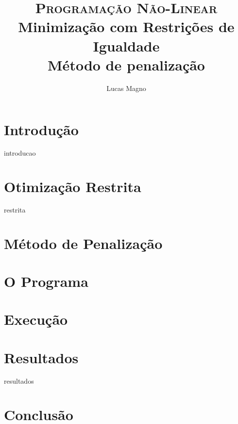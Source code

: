 \documentclass[paper=a4, fontsize=11pt]{scrartcl}	%
\title{
		\usefont{OT1}{bch}{b}{n}
		\normalfont \normalsize \textsc{Programação Não-Linear} \\ [25pt]
		\huge Minimização com Restrições de Igualdade \\
		\LARGE Método de penalização
}
\author{
		\normalfont 								\normalsize
        Lucas Magno\\[-3pt]		\normalsize
}
\date{}
\numberwithin{equation}{section}		%
\numberwithin{figure}{section}			%
\numberwithin{table}{section}				%
\begin{document}
\maketitle

\section{Introdução}
	{introducao}

\section{Otimização Restrita}
	{restrita}

\section{Método de Penalização}
\section{O Programa}
\section{Execução}
\section{Resultados}
	{resultados}

\section{Conclusão}


\end{document}
